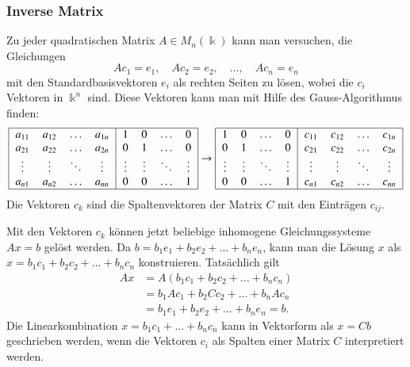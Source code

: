 \subsubsection{Inverse Matrix}
Zu jeder quadratischen Matrix $A\in M_n(\Bbbk)$ kann man versuchen, die
Gleichungen
\[
Ac_1 = e_1,\quad Ac_2 = e_2, \quad\dots, \quad Ac_n = e_n
\]
mit den Standardbasisvektoren $e_i$ als rechten Seiten zu lösen, wobei
die $c_i$ Vektoren in $\Bbbk^n$ sind.
Diese Vektoren kann man mit Hilfe des Gauss-Algorithmus finden:
\[
\begin{tabular}{|>{$}c<{$}>{$}c<{$}>{$}c<{$}>{$}c<{$}|>{$}c<{$}>{$}c<{$}>{$}c<{$}>{$}c<{$}|}
\hline
a_{11}&a_{12}&\dots &a_{1n}&1     &0     &\dots &0     \\
a_{21}&a_{22}&\dots &a_{2n}&0     &1     &\dots &0     \\
\vdots&\vdots&\ddots&\vdots&\vdots&\vdots&\ddots&\vdots\\
a_{n1}&a_{n2}&\dots &a_{nn}&0     &0     &\dots &1     \\
\hline
\end{tabular}
\rightarrow
\begin{tabular}{|>{$}c<{$}>{$}c<{$}>{$}c<{$}>{$}c<{$}|>{$}c<{$}>{$}c<{$}>{$}c<{$}>{$}c<{$}|}
\hline
1     &0     &\dots &0     &c_{11}&c_{12}&\dots &c_{1n}\\
0     &1     &\dots &0     &c_{21}&c_{22}&\dots &c_{2n}\\
\vdots&\vdots&\ddots&\vdots&\vdots&\vdots&\ddots&\vdots\\
0     &0     &\dots &1     &c_{n1}&c_{n2}&\dots &c_{nn}\\
\hline
\end{tabular}
\]
Die Vektoren $c_k$ sind die Spaltenvektoren der Matrix $C$ mit den
Einträgen $c_{i\!j}$.

Mit den Vektoren $c_k$ können jetzt beliebige inhomogene Gleichungssysteme
$Ax=b$ gelöst werden.
Da $b = b_1e_1 + b_2e_2 + \dots + b_ne_n$, kann man die Lösung $x$ als
$x = b_1c_1+b_2c_2+\dots+b_nc_n$ konstruieren.
Tatsächlich gilt
\begin{align*}
Ax
&=
A( b_1c_1+b_2c_2+\dots+b_nc_n)
\\
&=
b_1Ac_1 + b_2Cc_2 + \dots + b_nAc_n
\\
&=
b_1e_1 + b_2e_2 + \dots + b_ne_n
=
b.
\end{align*}
Die Linearkombination $x=b_1c_1+\dots+b_nc_n$ kann in Vektorform als $x=Cb$
geschrieben werden, wenn die Vektoren $c_i$ als Spalten einer Matrix $C$ 
interpretiert werden.


